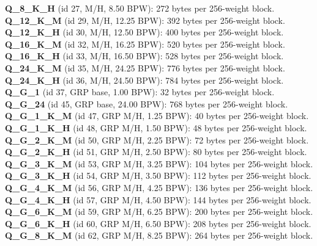 \noindent\textbf{Q\_8\_K\_H} (id 27, M/H, 8.50 BPW): 272 bytes per 256-weight block. \\
\noindent\textbf{Q\_12\_K\_M} (id 29, M/H, 12.25 BPW): 392 bytes per 256-weight block. \\
\noindent\textbf{Q\_12\_K\_H} (id 30, M/H, 12.50 BPW): 400 bytes per 256-weight block. \\
\noindent\textbf{Q\_16\_K\_M} (id 32, M/H, 16.25 BPW): 520 bytes per 256-weight block. \\
\noindent\textbf{Q\_16\_K\_H} (id 33, M/H, 16.50 BPW): 528 bytes per 256-weight block. \\
\noindent\textbf{Q\_24\_K\_M} (id 35, M/H, 24.25 BPW): 776 bytes per 256-weight block. \\
\noindent\textbf{Q\_24\_K\_H} (id 36, M/H, 24.50 BPW): 784 bytes per 256-weight block. \\
\noindent\textbf{Q\_G\_1} (id 37, GRP base, 1.00 BPW): 32 bytes per 256-weight block. \\
\noindent\textbf{Q\_G\_24} (id 45, GRP base, 24.00 BPW): 768 bytes per 256-weight block. \\
\noindent\textbf{Q\_G\_1\_K\_M} (id 47, GRP M/H, 1.25 BPW): 40 bytes per 256-weight block. \\
\noindent\textbf{Q\_G\_1\_K\_H} (id 48, GRP M/H, 1.50 BPW): 48 bytes per 256-weight block. \\
\noindent\textbf{Q\_G\_2\_K\_M} (id 50, GRP M/H, 2.25 BPW): 72 bytes per 256-weight block. \\
\noindent\textbf{Q\_G\_2\_K\_H} (id 51, GRP M/H, 2.50 BPW): 80 bytes per 256-weight block. \\
\noindent\textbf{Q\_G\_3\_K\_M} (id 53, GRP M/H, 3.25 BPW): 104 bytes per 256-weight block. \\
\noindent\textbf{Q\_G\_3\_K\_H} (id 54, GRP M/H, 3.50 BPW): 112 bytes per 256-weight block. \\
\noindent\textbf{Q\_G\_4\_K\_M} (id 56, GRP M/H, 4.25 BPW): 136 bytes per 256-weight block. \\
\noindent\textbf{Q\_G\_4\_K\_H} (id 57, GRP M/H, 4.50 BPW): 144 bytes per 256-weight block. \\
\noindent\textbf{Q\_G\_6\_K\_M} (id 59, GRP M/H, 6.25 BPW): 200 bytes per 256-weight block. \\
\noindent\textbf{Q\_G\_6\_K\_H} (id 60, GRP M/H, 6.50 BPW): 208 bytes per 256-weight block. \\
\noindent\textbf{Q\_G\_8\_K\_M} (id 62, GRP M/H, 8.25 BPW): 264 bytes per 256-weight block. \\
